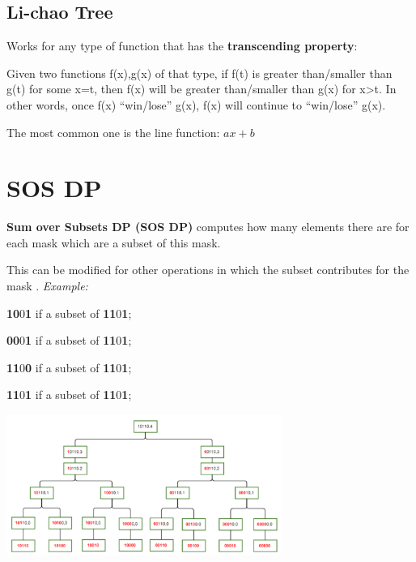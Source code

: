 
    \subsection{Li-chao Tree}

        Works for any type of function that has the \textbf{transcending property}:

        Given two functions f(x),g(x) of that type, 
        if f(t) is greater than/smaller than g(t) for some x=t,
        then f(x) will be greater than/smaller than g(x) for x>t.
        In other words, once f(x) “win/lose” g(x), f(x) will continue to “win/lose” g(x).

        The most common one is the line function: $ ax + b $

\section{SOS DP}

    \textbf{Sum over Subsets DP (SOS DP)} computes how many elements there are for each mask
    which are a subset of this mask.

    This can be modified for other operations in which the subset contributes for the mask
    .
    \textit{Example:}

    \textbf{10}0\textbf{1} if a subset of \textbf{11}0\textbf{1};

    \textbf{00}0\textbf{1} if a subset of \textbf{11}0\textbf{1};
    
    \textbf{11}0\textbf{0} if a subset of \textbf{11}0\textbf{1};
    
    \textbf{11}0\textbf{1} if a subset of \textbf{11}0\textbf{1};

    \begin{center}
        \includegraphics[width=9cm]{content/dynamic-programming/sos-example.pdf}
    \end{center}

